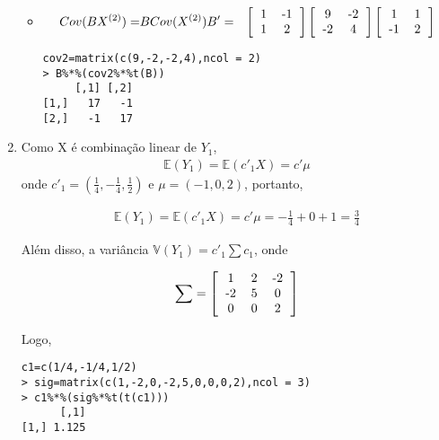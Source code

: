 \documentclass[11pt,a4paper]{book}
\begin{document}
\begin{enumerate}
\begin{itemize}
					\item
					\begin{eqnarray*}
						Cov(BX^{(2)})=&BCov(X^{(2)})B'
						=&\left[
						\begin{tabular}{c c}
						1 & -1\\
						1 & 2\\
						\end{tabular}
						\right]
						\left[
						\begin{tabular}{c c}
						9 & -2\\
						-2 & 4\\
						\end{tabular}
						\right]
						\left[
						\begin{tabular}{c c}
						1 & 1\\
						-1 & 2\\
						\end{tabular}
						\right]
					\end{eqnarray*}
					
					\begin{lstlisting}
cov2=matrix(c(9,-2,-2,4),ncol = 2)
> B%*%(cov2%*%t(B))
     [,1] [,2]
[1,]   17   -1
[2,]   -1   17
					\end{lstlisting}
				\end{itemize}
			\item
			Como X é combinação linear de $Y_1$,
			\begin{eqnarray*}
			\mathbb{E}(Y_1)=\mathbb{E}(c'_1X)=c'\mu
			\end{eqnarray*}
			onde $c'_1=(\frac{1}{4},-\frac{1}{4},\frac{1}{2})$ e $\mu=(-1,0,2)$, portanto,
			
			\begin{eqnarray*}
			\mathbb{E}(Y_1)=\mathbb{E}(c'_1X)=c'\mu = -\frac{1}{4}+0+1=\frac{3}{4}
			\end{eqnarray*}
			
			Além disso, a variância $\mathbb{V}(Y_1)=c'_1\sum c_1$, onde
			
			\begin{eqnarray*}
			\sum=\left[
			\begin{tabular}{c c c}
			1 & 2 & -2\\
			-2 & 5 & 0\\
			0 & 0 & 2\\
			\end{tabular}
			\right]
			\end{eqnarray*}
			
			Logo,
			\begin{lstlisting}
c1=c(1/4,-1/4,1/2)
> sig=matrix(c(1,-2,0,-2,5,0,0,0,2),ncol = 3)
> c1%*%(sig%*%t(t(c1)))
      [,1]
[1,] 1.125
			\end{lstlisting}
			

\end{enumerate}
\end{document}
